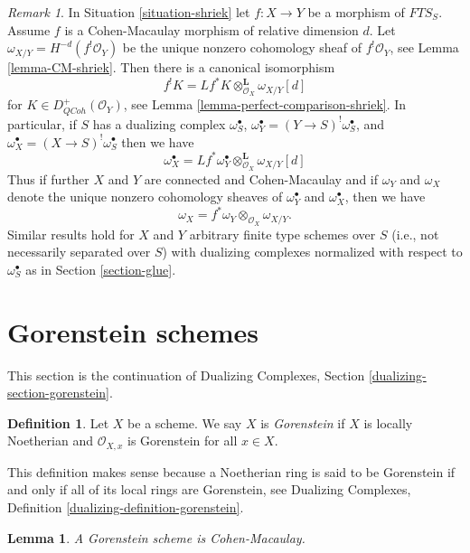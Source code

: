 \documentclass{stacks-project}
\theoremstyle{plain}
\newtheorem{lemma}[subsection]{Lemma}
\theoremstyle{definition}
\newtheorem{definition}[subsection]{Definition}
\theoremstyle{remark}
\newtheorem{remark}[subsection]{Remark}
\numberwithin{equation}{subsection}
\def\QCoh{\mathit{QCoh}}
\begin{document}
\begin{remark}
\label{remark-CM-morphism-compare-dualizing}
In Situation \ref{situation-shriek} let $f : X \to Y$ be a morphism
of $\textit{FTS}_S$. Assume $f$ is a Cohen-Macaulay morphism of
relative dimension $d$. Let $\omega_{X/Y} = H^{-d}(f^!\mathcal{O}_Y)$
be the unique nonzero cohomology sheaf of $f^!\mathcal{O}_Y$, see
Lemma \ref{lemma-CM-shriek}.
Then there is a canonical isomorphism
$$
f^!K = Lf^*K \otimes_{\mathcal{O}_X}^\mathbf{L} \omega_{X/Y}[d]
$$
for $K \in D^+_\QCoh(\mathcal{O}_Y)$, see
Lemma \ref{lemma-perfect-comparison-shriek}. In particular, if
$S$ has a dualizing complex $\omega_S^\bullet$,
$\omega_Y^\bullet = (Y \to S)^!\omega_S^\bullet$, and
$\omega_X^\bullet = (X \to S)^!\omega_S^\bullet$
then we have
$$
\omega_X^\bullet =
Lf^*\omega_Y^\bullet \otimes_{\mathcal{O}_X}^\mathbf{L} \omega_{X/Y}[d]
$$
Thus if further $X$ and $Y$ are connected and Cohen-Macaulay and
if $\omega_Y$ and $\omega_X$ denote the unique nonzero cohomology
sheaves of $\omega_Y^\bullet$ and $\omega_X^\bullet$, then we
have
$$
\omega_X = f^*\omega_Y \otimes_{\mathcal{O}_X} \omega_{X/Y}.
$$
Similar results hold for $X$ and $Y$ arbitrary finite type schemes
over $S$ (i.e., not necessarily separated over $S$)
with dualizing complexes normalized with respect to
$\omega_S^\bullet$ as in Section \ref{section-glue}.
\end{remark}





\section{Gorenstein schemes}
\label{section-gorenstein}

\noindent
This section is the continuation of Dualizing Complexes, Section
\ref{dualizing-section-gorenstein}.

\begin{definition}
\label{definition-gorenstein}
Let $X$ be a scheme. We say $X$ is {\it Gorenstein} if $X$ is
locally Noetherian and $\mathcal{O}_{X, x}$ is Gorenstein for all $x \in X$.
\end{definition}

\noindent
This definition makes sense because a Noetherian ring is said to
be Gorenstein if and only if all of its local rings are Gorenstein,
see Dualizing Complexes, Definition \ref{dualizing-definition-gorenstein}.

\begin{lemma}
\label{lemma-gorenstein-CM}
A Gorenstein scheme is Cohen-Macaulay.
\end{lemma}
\end{document}
